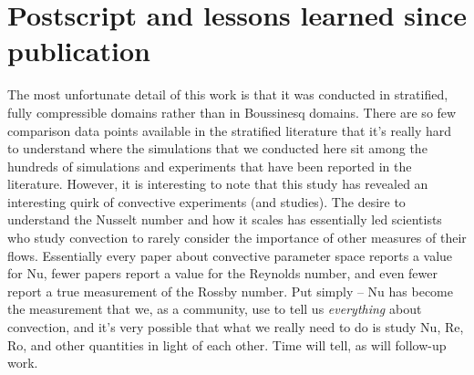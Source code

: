 \newpage
\section{Postscript and lessons learned since publication}
\label{sec_ro_p19_:ro_p19_postscript}
The most unfortunate detail of this work is that it was conducted in stratified, fully compressible domains rather than in Boussinesq domains.
There are so few comparison data points available in the stratified literature that it's really hard to understand where the simulations that we conducted here sit among the hundreds of simulations and experiments that have been reported in the \RB literature.
However, it is interesting to note that this study has revealed an interesting quirk of convective experiments (and studies).
The desire to understand the Nusselt number and how it scales has essentially led scientists who study convection to rarely consider the importance of other measures of their flows.
Essentially every paper about convective parameter space reports a value for Nu, fewer papers report a value for the Reynolds number, and even fewer report a true measurement of the Rossby number.
Put simply -- Nu has become the measurement that we, as a community, use to tell us \emph{everything} about convection, and it's very possible that what we really need to do is study Nu, Re, Ro, and other quantities in light of each other.
Time will tell, as will follow-up work.

